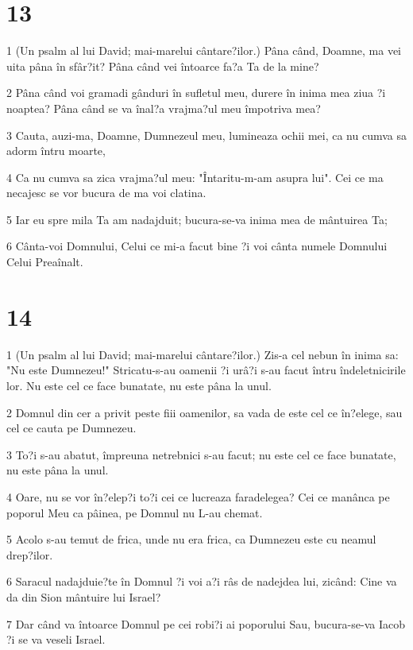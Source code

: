 \chapter{13}

\par 1 (Un psalm al lui David; mai-marelui cântare?ilor.) Pâna când, Doamne, ma vei uita pâna în sfâr?it? Pâna când vei întoarce fa?a Ta de la mine?
\par 2 Pâna când voi gramadi gânduri în sufletul meu, durere în inima mea ziua ?i noaptea? Pâna când se va înal?a vrajma?ul meu împotriva mea?
\par 3 Cauta, auzi-ma, Doamne, Dumnezeul meu, lumineaza ochii mei, ca nu cumva sa adorm întru moarte,
\par 4 Ca nu cumva sa zica vrajma?ul meu: "Întaritu-m-am asupra lui". Cei ce ma necajesc se vor bucura de ma voi clatina.
\par 5 Iar eu spre mila Ta am nadajduit; bucura-se-va inima mea de mântuirea Ta;
\par 6 Cânta-voi Domnului, Celui ce mi-a facut bine ?i voi cânta numele Domnului Celui Preaînalt.

\chapter{14}

\par 1 (Un psalm al lui David; mai-marelui cântare?ilor.) Zis-a cel nebun în inima sa: "Nu este Dumnezeu!" Stricatu-s-au oamenii ?i urâ?i s-au facut întru îndeletnicirile lor. Nu este cel ce face bunatate, nu este pâna la unul.
\par 2 Domnul din cer a privit peste fiii oamenilor, sa vada de este cel ce în?elege, sau cel ce cauta pe Dumnezeu.
\par 3 To?i s-au abatut, împreuna netrebnici s-au facut; nu este cel ce face bunatate, nu este pâna la unul.
\par 4 Oare, nu se vor în?elep?i to?i cei ce lucreaza faradelegea? Cei ce manânca pe poporul Meu ca pâinea, pe Domnul nu L-au chemat.
\par 5 Acolo s-au temut de frica, unde nu era frica, ca Dumnezeu este cu neamul drep?ilor.
\par 6 Saracul nadajduie?te în Domnul ?i voi a?i râs de nadejdea lui, zicând: Cine va da din Sion mântuire lui Israel?
\par 7 Dar când va întoarce Domnul pe cei robi?i ai poporului Sau, bucura-se-va Iacob ?i se va veseli Israel.

